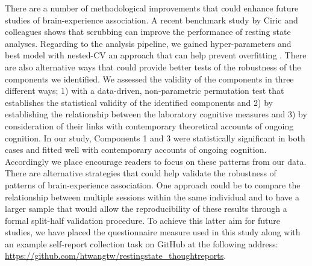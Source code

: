 There are a number of methodological improvements that could enhance future studies of brain-experience association. A recent benchmark study by Ciric and colleagues \cite{Ciric2017}%
shows that scrubbing can improve the performance of resting state analyses. Regarding to the analysis pipeline, we gained hyper-parameters and best model with nested-CV an approach that can help prevent overfitting \cite{BzdokYeo2017}.%
There are also alternative ways that could provide better tests of the robustness of the components we identified. We assessed the validity of the components in three different ways; 1) with a data-driven, non-parametric permutation test \cite{Smith2015}%
that establishes the statistical validity of the identified components and 2) by establishing the relationship between the laboratory cognitive measures and 3) by consideration of their links with contemporary theoretical accounts of ongoing cognition. In our study, Components 1 and 3 were statistically significant in both cases and fitted well with contemporary accounts of ongoing cognition. Accordingly we place encourage readers to focus on these patterns from our data. There are alternative strategies that could help validate the robustness of patterns of brain-experience association. One approach could be to compare the relationship between multiple sessions within the same individual \cite{Poldrack2015}%
and to have a larger sample that would allow the reproducibility of these results through a formal split-half validation procedure. To achieve this latter aim for future studies, we have placed the questionnaire measure used in this study along with an example self-report collection task on GitHub at the following address: \url{https://github.com/htwangtw/restingstate_thoughtreports}.
